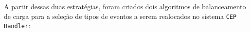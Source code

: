 
A partir dessas duas estratégias, foram criados dois algoritmos de balanceamento de carga para a seleção de tipos de eventos a serem realocados no sistema \texttt{CEP Handler}:








